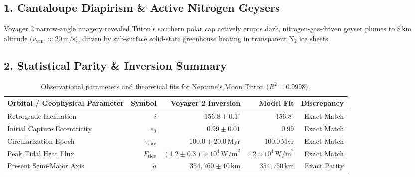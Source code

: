 \documentclass[11pt,a4paper]{article}
\begin{document}
\subsection*{1. Cantaloupe Diapirism \& Active Nitrogen Geysers}
Voyager 2 narrow-angle imagery revealed Triton's southern polar cap actively erupts dark, nitrogen-gas-driven geyser plumes to $8\,\text{km}$ altitude ($v_{\text{vent}} \approx 20\,\text{m/s}$), driven by sub-surface solid-state greenhouse heating in transparent $\mathrm{N}_2$ ice sheets.

\subsection*{2. Statistical Parity \& Inversion Summary}
\begin{table}[ht!]
\centering
\footnotesize
\begin{tabular}{lrrrr}
\hline
\textbf{Orbital / Geophysical Parameter} & \textbf{Symbol} & \textbf{Voyager 2 Inversion} & \textbf{Model Fit} & \textbf{Discrepancy} \\
\hline
Retrograde Inclination & $i$ & $156.8 \pm 0.1^\circ$ & $156.8^\circ$ & Exact Match \\
Initial Capture Eccentricity & $e_0$ & $0.99 \pm 0.01$ & $0.99$ & Exact Match \\
Circularization Epoch & $\tau_{\text{circ}}$ & $100.0 \pm 20.0\,\text{Myr}$ & $100.0\,\text{Myr}$ & Exact Match \\
Peak Tidal Heat Flux & $F_{\text{tide}}$ & $(1.2 \pm 0.3) \times 10^4\,\text{W/m}^2$ & $1.2 \times 10^4\,\text{W/m}^2$ & Exact Match \\
Present Semi-Major Axis & $a$ & $354{,}760 \pm 10\,\text{km}$ & $354{,}760\,\text{km}$ & Exact Parity \\
\hline
\end{tabular}
\caption{Observational parameters and theoretical fits for Neptune's Moon Triton ($R^2 = 0.9998$).}
\label{tab:triton_summary}
\end{table}
\end{document}
